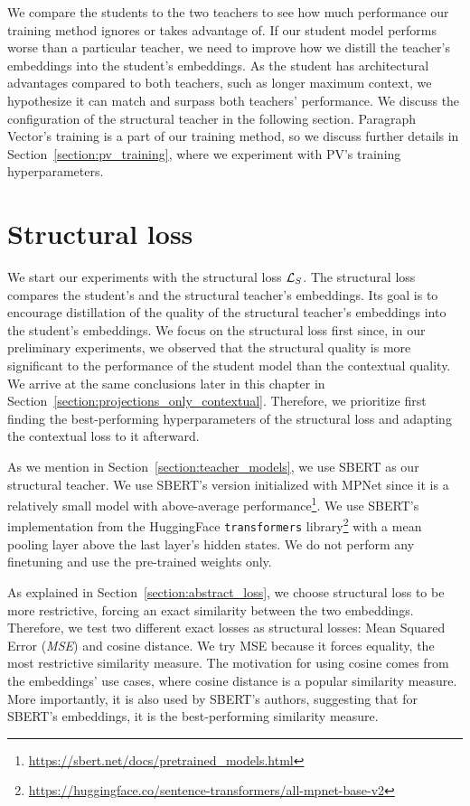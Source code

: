 We compare the students to the two teachers to see how much performance our
training method ignores or takes advantage of. If our student model performs
worse than a particular teacher, we need to improve how we distill the
teacher's embeddings into the student's embeddings. As the student has
architectural advantages compared to both teachers, such as longer maximum
context, we hypothesize it can match and surpass both teachers' performance. We
discuss the configuration of the structural teacher in the following section.
Paragraph Vector's training is a part of our training method, so we discuss
further details in Section~\ref{section:pv_training}, where we experiment with
PV's training hyperparameters.

\section{Structural loss}\label{section:structural_loss}

We start our experiments with the structural loss $\mathcal{L}_S$. The structural
loss compares the student's and the structural teacher's embeddings. Its
goal is to encourage distillation of the quality of the structural teacher's
embeddings into the student's embeddings. We focus on the structural loss first
since, in our preliminary experiments, we observed that the structural quality
is more significant to the performance of the student model than the contextual
quality. We arrive at the same conclusions later in this chapter in
Section~\ref{section:projections_only_contextual}. Therefore, we prioritize
first finding the best-performing hyperparameters of the structural loss and
adapting the contextual loss to it afterward.

As we mention in Section~\ref{section:teacher_models}, we use SBERT
\citep{reimers2019sentence} as our structural teacher. We use SBERT's version
initialized with MPNet \citep{song2020mpnet} since it is a relatively small
model with above-average
performance\footnote{\url{https://sbert.net/docs/pretrained_models.html}}. We
use SBERT's implementation from the HuggingFace \texttt{transformers}
library\footnote{\url{https://huggingface.co/sentence-transformers/all-mpnet-base-v2}}
with a mean pooling layer above the last layer's hidden states. We do not
perform any finetuning and use the pre-trained weights only.

As explained in Section~\ref{section:abstract_loss}, we choose structural loss
to be more restrictive, forcing an exact similarity between the two embeddings.
Therefore, we test two different exact losses as structural losses: Mean Squared
Error (\emph{MSE}) and cosine distance. We try MSE because it forces
equality, the most restrictive similarity measure. The motivation for using
cosine comes from the embeddings' use cases, where cosine distance is a popular
similarity measure. More importantly, it is also used by SBERT's authors,
suggesting that for SBERT's embeddings, it is the best-performing similarity
measure.


